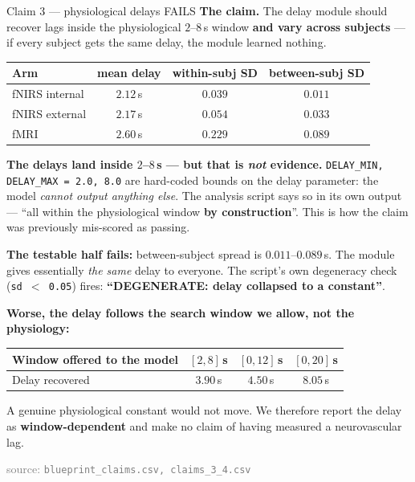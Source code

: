\documentclass[aspectratio=169,11pt]{beamer}
\newcommand{\src}[1]{{\scriptsize\textcolor{gray}{source: \texttt{#1}}}}
\begin{document}
\begin{frame}{Claim 3 --- physiological delays \quad \textcolor{bad}{FAILS}}
\textbf{The claim.} The delay module should recover lags inside the
physiological $2$--$8$\,s window \textbf{and vary across subjects} --- if every
subject gets the same delay, the module learned nothing.

\begin{center}\small
\begin{tabular}{lccc}
\toprule
Arm & mean delay & within-subj SD & \textbf{between-subj SD} \\
\midrule
fNIRS internal & $2.12$\,s & $0.039$ & \textcolor{bad}{$\mathbf{0.011}$} \\
fNIRS external & $2.17$\,s & $0.054$ & \textcolor{bad}{$\mathbf{0.033}$} \\
fMRI           & $2.60$\,s & $0.229$ & \textcolor{bad}{$\mathbf{0.089}$} \\
\bottomrule
\end{tabular}
\end{center}

\textcolor{bad}{\textbf{The delays land inside $2$--$8$\,s --- but that is
\emph{not} evidence.}} \texttt{DELAY\_MIN, DELAY\_MAX = 2.0, 8.0} are hard-coded
bounds on the delay parameter: the model \emph{cannot output anything else}. The
analysis script says so in its own output --- ``all within the physiological
window \textbf{by construction}''. This is how the claim was previously
mis-scored as passing.

\vspace{0.3em}
\textbf{The testable half fails:} between-subject spread is $0.011$--$0.089$\,s.
The module gives essentially \emph{the same} delay to everyone. The script's own
degeneracy check (\texttt{sd $<$ 0.05}) fires: \textbf{``DEGENERATE: delay
collapsed to a constant''}.

\vspace{0.4em}
\textbf{Worse, the delay follows the search window we allow, not the physiology:}
\begin{center}\small
\begin{tabular}{lccc}
\toprule
Window offered to the model & $[2,8]$\,s & $[0,12]$\,s & $[0,20]$\,s \\
\midrule
Delay recovered & $3.90$\,s & $4.50$\,s & $8.05$\,s \\
\bottomrule
\end{tabular}
\end{center}
A genuine physiological constant would not move. We therefore report the delay as
\textbf{window-dependent} and make no claim of having measured a neurovascular lag.

\vspace{0.3em}
\src{blueprint\_claims.csv, claims\_3\_4.csv}
\end{frame}
\end{document}
